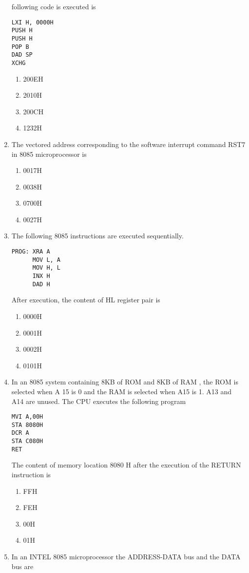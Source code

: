 \documentclass[journal,12pt,twocolumn]{IEEEtran}
\begin{document}
\begin{enumerate}
following code is executed is \\
\begin{verbatim}
LXI H, 0000H
PUSH H
PUSH H
POP B
DAD SP
XCHG
\end{verbatim}
\begin{enumerate}
\item 200EH     \item  2010H
\item 200CH     \item  1232H
\end{enumerate}
    \item The vectored address corresponding to the software interrupt command RST7 in 8085
microprocessor is 
    \begin{enumerate}
      \item 0017H 
      \item 0038H
      \item 0700H
      \item 0027H
    \end{enumerate}
    \item The following 8085 instructions are executed sequentially.
\begin{verbatim}
PROG: XRA A
      MOV L, A
      MOV H, L
      INX H
      DAD H
\end{verbatim}
After execution, the content of HL register pair is
    \begin{enumerate}
      \item 0000H 
      \item 0001H
      \item 0002H
      \item 0101H
    \end{enumerate}
    \item In an 8085 system containing 8KB of ROM and 8KB of RAM , the ROM is selected when A 15
is 0 and the RAM is selected when A15 is 1. A13 and A14 are unused. The CPU executes the
following program
\begin{verbatim}
MVI A,00H
STA 8080H
DCR A
STA C080H
RET
\end{verbatim}
The content of memory location 8080 H after the execution of the RETURN instruction is 
    \begin{enumerate}
      \item FFH
      \item FEH
      \item 00H
      \item 01H
     \end{enumerate}
     \item In an INTEL 8085 microprocessor the ADDRESS-DATA bus and the DATA bus are

\end{enumerate}
\end{document}
